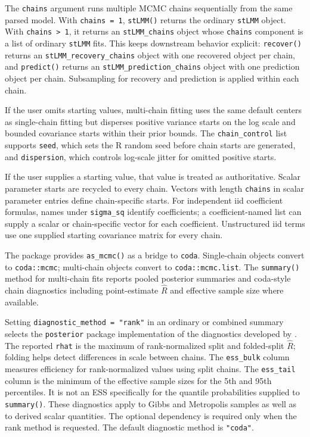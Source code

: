 \documentclass[11pt]{article}
\begin{document}
The \texttt{chains} argument runs multiple MCMC chains sequentially from the same parsed model. With \texttt{chains = 1}, \texttt{stLMM()} returns the ordinary \texttt{stLMM} object. With \texttt{chains > 1}, it returns an \texttt{stLMM\_chains} object whose \texttt{chains} component is a list of ordinary \texttt{stLMM} fits. This keeps downstream behavior explicit: \texttt{recover()} returns an \texttt{stLMM\_recovery\_chains} object with one recovered object per chain, and \texttt{predict()} returns an \texttt{stLMM\_prediction\_chains} object with one prediction object per chain. Subsampling for recovery and prediction is applied within each chain.

If the user omits starting values, multi-chain fitting uses the same default centers as single-chain fitting but disperses positive variance starts on the log scale and bounded covariance starts within their prior bounds. The \texttt{chain\_control} list supports \texttt{seed}, which sets the R random seed before chain starts are generated, and \texttt{dispersion}, which controls log-scale jitter for omitted positive starts.

If the user supplies a starting value, that value is treated as authoritative. Scalar parameter starts are recycled to every chain. Vectors with length \texttt{chains} in scalar parameter entries define chain-specific starts. For independent iid coefficient formulas, names under \texttt{sigma\_sq} identify coefficients; a coefficient-named list can supply a scalar or chain-specific vector for each coefficient. Unstructured iid terms use one supplied starting covariance matrix for every chain.

The package provides \texttt{as\_mcmc()} as a bridge to \texttt{coda}. Single-chain objects convert to \texttt{coda::mcmc}; multi-chain objects convert to \texttt{coda::mcmc.list}. The \texttt{summary()} method for multi-chain fits reports pooled posterior summaries and coda-style chain diagnostics including point-estimate $\hat R$ and effective sample size where available.

Setting \texttt{diagnostic\_method = "rank"} in an ordinary or combined summary selects the \texttt{posterior} package implementation \citep{posteriorPackage} of the diagnostics developed by \citet{Vehtari2021Rhat}. The reported \texttt{rhat} is the maximum of rank-normalized split and folded-split $\hat R$; folding helps detect differences in scale between chains. The \texttt{ess\_bulk} column measures efficiency for rank-normalized values using split chains. The \texttt{ess\_tail} column is the minimum of the effective sample sizes for the 5th and 95th percentiles. It is not an ESS specifically for the quantile probabilities supplied to \texttt{summary()}. These diagnostics apply to Gibbs and Metropolis samples as well as to derived scalar quantities. The optional dependency is required only when the rank method is requested. The default diagnostic method is \texttt{"coda"}.
\end{document}
